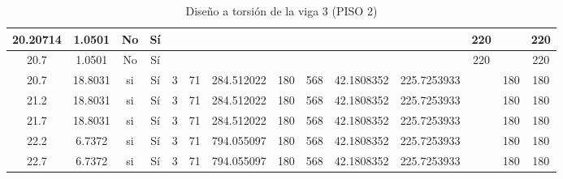 \begin{table}[H]
{\begin{tabular}{|c|c|c|c|c|c|c|c|c|c|c|c|c|c|}
\hline
20.20714 & 1.0501 & No  & Sí  &     &     &     &     &     &     &     & 220 &     & 220 \bigstrut\\
\hline
20.7 & 1.0501 & No  & Sí  &     &     &     &     &     &     &     & 220 &     & 220 \bigstrut\\
\hline
20.7 & 18.8031 & si  & Sí  & 3   & 71  & 284.512022 & 180 & 568 & 42.1808352 & 225.7253933 &     & 180 & 180 \bigstrut\\
\hline
21.2 & 18.8031 & si  & Sí  & 3   & 71  & 284.512022 & 180 & 568 & 42.1808352 & 225.7253933 &     & 180 & 180 \bigstrut\\
\hline
21.7 & 18.8031 & si  & Sí  & 3   & 71  & 284.512022 & 180 & 568 & 42.1808352 & 225.7253933 &     & 180 & 180 \bigstrut\\
\hline
22.2 & 6.7372 & si  & Sí  & 3   & 71  & 794.055097 & 180 & 568 & 42.1808352 & 225.7253933 &     & 180 & 180 \bigstrut\\
\hline
22.7 & 6.7372 & si  & Sí  & 3   & 71  & 794.055097 & 180 & 568 & 42.1808352 & 225.7253933 &     & 180 & 180 \bigstrut\\
\hline
\end{tabular}%

%
  }
      \caption{Diseño a torsión de la viga 3 (PISO 2) }
  \label{tab:T VG3 P2 }%
\end{table}%
